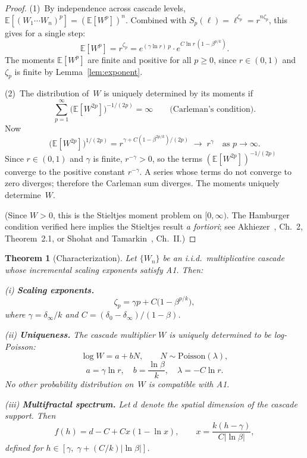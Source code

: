 \documentclass[12pt]{amsart}
\newtheorem{theorem}{Theorem}
\theoremstyle{definition}
\theoremstyle{remark}
\begin{document}
\begin{proof}
(1)~By independence across cascade levels, $\mathbb{E}[(W_1 \cdots
W_n)^p] = (\mathbb{E}[W^p])^n$.  Combined with $S_p(\ell) =
\ell^{\zeta_p} = r^{n\zeta_p}$, this gives for a single step:
\[
  \mathbb{E}[W^p] = r^{\zeta_p}
  = e^{(\gamma \ln r)\,p}\cdot e^{C \ln r\,(1 - \beta^{p/k})}.
\]
The moments $\mathbb{E}[W^p]$ are finite and positive for all $p \geq
0$, since $r \in (0,1)$ and $\zeta_p$ is finite by
Lemma~\ref{lem:exponent}.

(2)~The distribution of~$W$ is uniquely determined by its moments if
\[
  \sum_{p=1}^{\infty}
  \bigl(\mathbb{E}[W^{2p}]\bigr)^{-1/(2p)} = \infty
  \qquad\text{(Carleman's condition).}
\]
Now
\[
  \bigl(\mathbb{E}[W^{2p}]\bigr)^{1/(2p)}
  = r^{\gamma + C(1 - \beta^{2p/k})/(2p)}
  \;\longrightarrow\; r^\gamma
  \quad\text{as } p \to \infty.
\]
Since $r \in (0,1)$ and $\gamma$ is finite, $r^{-\gamma} > 0$, so
the terms $(\mathbb{E}[W^{2p}])^{-1/(2p)}$ converge to the positive
constant $r^{-\gamma}$.  A series whose terms do not converge to zero
diverges; therefore the Carleman sum diverges.  The moments uniquely
determine~$W$.

(Since $W > 0$, this is the Stieltjes moment problem on $[0,\infty)$.
The Hamburger condition verified here implies the Stieltjes result
\textit{a fortiori}; see Akhiezer~\cite{Akh65}, Ch.~2, Theorem~2.1,
or Shohat and Tamarkin~\cite{ST43}, Ch.~II.)
\end{proof}


\begin{theorem}[Characterization]\label{thm:characterization}
Let $\{W_n\}$ be an i.i.d.\ multiplicative cascade whose incremental
scaling exponents satisfy A1.  Then:

\textup{(i)} \textbf{Scaling exponents.}
\[
  \zeta_p = \gamma p + C\bigl(1 - \beta^{p/k}\bigr),
\]
where $\gamma = \delta_\infty/k$ and $C = (\delta_0 -
\delta_\infty)/(1-\beta)$.

\textup{(ii)} \textbf{Uniqueness.}  The cascade multiplier $W$ is
uniquely determined to be log-Poisson:
\[
  \log W = a + bN, \qquad N \sim \mathrm{Poisson}(\lambda),
\]
\[
  a = \gamma \ln r, \quad
  b = \frac{\ln\beta}{k}, \quad
  \lambda = -C\ln r.
\]
No other probability distribution on~$W$ is compatible with A1.

\textup{(iii)} \textbf{Multifractal spectrum.}  Let $d$ denote the
spatial dimension of the cascade support.  Then
\[
  f(h) = d - C + Cx(1 - \ln x),
  \qquad
  x = \frac{k(h - \gamma)}{C|\ln\beta|},
\]
defined for $h \in [\gamma,\; \gamma + (C/k)|\ln\beta|]$.
\end{theorem}
\end{document}
